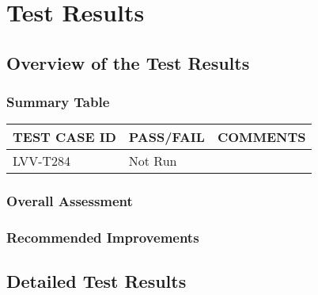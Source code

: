 \documentclass[DM,lsstdraft,STR,toc]{lsstdoc}
\begin{document}
\newpage

\section{Test Results}
\label{sect:testresults}

\subsection{Overview of the Test Results}
\label{sect:overview}

\subsubsection{Summary Table}
\label{sect:summarytable}


\begin{longtable} {|p{}|p{}|p{}|}
\hline
{\bf TEST CASE ID} & {\bf PASS/FAIL} & {\bf COMMENTS} \\\hline
LVV-T284 & Not Run & \\\hline
\end{longtable}

\subsubsection{Overall Assessment}
\label{sect:overallassessment}


\subsubsection{Recommended Improvements}
\label{sect:recommendations}

\subsection{Detailed Test Results}
\label{sect:detailedtestresults}
\end{document}
